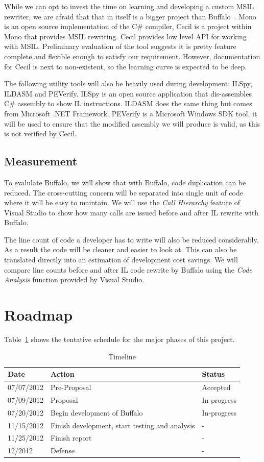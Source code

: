 While we can opt to invest the time on learning and developing a custom MSIL rewriter, we are afraid that that in itself is a bigger project than Buffalo~\cite{msil_text}. Mono is an open source implementation of the C\# compiler, Cecil is a project within Mono that provides MSIL rewriting. Cecil provides low level API for working with MSIL. Preliminary evaluation of the tool suggests it is pretty feature complete and flexible enough to satisfy our requirement. However, documentation for Cecil is next to non-existent, so the learning curve is expected to be deep.

The following utility tools will also be heavily used during development: ILSpy, ILDASM and PEVerify. ILSpy is an open source application that dis-assembles C\# assembly to show IL instructions. ILDASM does the same thing but comes from Microsoft .NET Framework. PEVerify is a Microsoft Windows SDK tool, it will be used to ensure that the modified assembly we will produce is valid, as this is not verified by Cecil.

\subsection{Measurement}
To evalulate Buffalo, we will show that with Buffalo, code duplication can be reduced. The cross-cutting concern will be separated into single unit of code where it will be easy to maintain. We will use the {\em Call Hierarchy} feature of Visual Studio to show how many calls are issued before and after IL rewrite with Buffalo. 

The line count of code a developer has to write will also be reduced considerably. As a result the code will be cleaner and easier to look at. This can also be translated directly into an estimation of development cost savings. We will compare line counts before and after IL code rewrite by Buffalo using the {\em Code Analysis} function provided by Visual Studio.

\section{Roadmap}
Table~\ref{tab:roadmap_tbl} shows the tentative schedule for the major phases of this project.

\begin{table}[H]
\centering
\begin{tabular}{|l|l|l|}
\hline
Date & Action & Status\\
\hline
07/07/2012 & Pre-Proposal & Accepted\\
07/09/2012 & Proposal & In-progress\\
07/20/2012 & Begin development of Buffalo & In-progress\\
11/15/2012 & Finish development, start testing and analysis & - \\
11/25/2012 & Finish report & - \\
12/2012 & Defense & - \\
\hline
\end{tabular}
\caption{Timeline}
\label{tab:roadmap_tbl}
\end{table}

